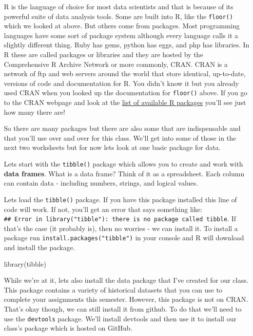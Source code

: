\documentclass[
]{article}
\newenvironment{Shaded}{\begin{snugshade}}{\end{snugshade}}
\newcommand{\FunctionTok}[1]{\textcolor[rgb]{0.00,0.00,0.00}{#1}}
\newcommand{\NormalTok}[1]{#1}
\begin{document}
R is the language of choice for most data scientists and that is because
of its powerful suite of data analysis tools. Some are built into R,
like the \texttt{floor()} which we looked at above. But others come from
packages. Most programming languages have some sort of package system
although every language calls it a slightly different thing. Ruby has
gems, python has eggs, and php has libraries. In R these are called
packages or libraries and they are hosted by the Comprehensive R Archive
Network or more commonly, CRAN. CRAN is a network of ftp and web servers
around the world that store identical, up-to-date, versions of code and
documentation for R. You didn't know it but you already used CRAN when
you looked up the documentation for \texttt{floor()} above. If you go to
the CRAN webpage and look at the
\href{https://cran.r-project.org/web/packages/available_packages_by_name.html}{list
of available R packages} you'll see just how many there are!

So there are many packages but there are also some that are
indispensable and that you'll use over and over for this class. We'll
get into some of those in the next two worksheets but for now lets look
at one basic package for data.

Lets start with the \texttt{tibble()} package which allows you to create
and work with \textbf{data frames}. What is a data frame? Think of it as
a spreadsheet. Each column can contain data - including numbers,
strings, and logical values.

Lets load the \texttt{tibble()} package. If you have this package
installed this line of code will work. If not, you'll get an error that
says something like:
\texttt{\#\#\ Error\ in\ library("tibble"):\ there\ is\ no\ package\ called\ \textquotesingle{}tibble\textquotesingle{}}.
If that's the case (it probably is), then no worries - we can install
it. To install a package run \texttt{install.packages("tibble")} in your
console and R will download and install the package.

\begin{Shaded}
\begin{Highlighting}[]
\FunctionTok{library}\NormalTok{(tibble)}
\end{Highlighting}
\end{Shaded}

While we're at it, lets also install the data package that I've created
for our class. This package contains a variety of historical datasets
that you can use to complete your assignments this semester. However,
this package is not on CRAN. That's okay though, we can still install it
from github. To do that we'll need to use the \texttt{devtools} package.
We'll install devtools and then use it to install our class's package
which is hosted on GitHub.
\end{document}
